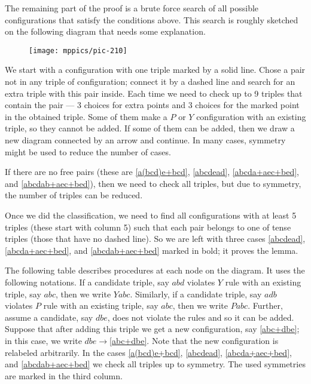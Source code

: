 \documentclass{article}
\begin{document}
The remaining part of the proof is a brute force search of all possible configurations that satisfy the conditions above.
This search is roughly sketched on the following diagram that needs some explanation.
\begin{figure}[ht!]
\centering
\texttt{[image: mppics/pic-210]}
\end{figure}
We start with a configuration with one triple marked by a solid line.
Chose a pair not in any triple of configuration;
connect it by a dashed line and search for an extra triple with this pair inside.
Each time we need to check up to 9 triples that contain the pair --- 3 choices for extra points and 3 choices for the marked point in the obtained triple.
Some of them make a $P$ or $Y$ configuration with an existing triple, so they cannot be added.
If some of them can be added, then we draw a new diagram connected by an arrow and continue.
In many cases, symmetry might be used to reduce the number of cases.
 

If there are no free pairs (these are \ref{a(bcd)e+bcd}, \ref{abcdead}, \ref{abcda+aec+bed}, and \ref{abcdab+aec+bed}),
then we need to check all triples,
but due to symmetry, the number of triples can be reduced.

Once we did the classification, we need to find all configurations with at least 5 triples (these start with column 5)
such that each pair belongs to one of tense triples (those that have no dashed line).
So we are left with three cases \ref{abcdead}, \ref{abcda+aec+bed}, and \ref{abcdab+aec+bed} marked in bold;
it proves the lemma.

The following table describes procedures at each node on the diagram.
It uses the following notations.
If a candidate triple, say $abd$ violates $Y$ rule with an existing triple, say $abc$, then we write $Yabc$.
Similarly, if a candidate triple, say $adb$ violates $P$ rule with an existing triple, say $abc$, then we write $Pabc$.
Further, assume a candidate, say $dbe$, does not violate the rules and so it can be added.
Suppose that after adding this triple we get a new configuration, say \ref{abc+dbe};
in this case, we write $dbe{\to}$\ref{abc+dbe}.
Note that the new configuration is relabeled arbitrarily.
In the cases \ref{a(bcd)e+bcd}, \ref{abcdead}, \ref{abcda+aec+bed}, and \ref{abcdab+aec+bed} we check all triples up to symmetry.
The used symmetries are marked in the third column.


\setcounter{foo}{0}
\newcommand{\myitem}{\refstepcounter{foo}\thefoo}
\end{document}
